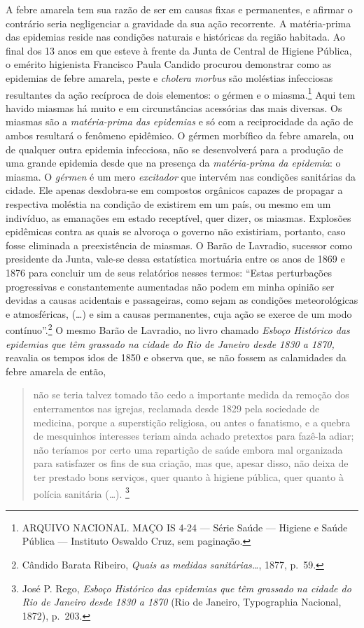 A febre amarela tem sua razão de ser em causas fixas e permanentes, e
afirmar o contrário seria negligenciar a gravidade da sua ação
recorrente. A matéria-prima das epidemias reside nas condições naturais
e históricas da região habitada. Ao final dos 13 anos em que esteve à
frente da Junta de Central de Higiene Pública, o emérito higienista
Francisco Paula Candido procurou demonstrar como as epidemias de febre
amarela, peste e \textit{cholera morbus} são moléstias infecciosas
resultantes da ação recíproca de dois elementos: o gérmen e o
miasma.\footnote{ARQUIVO NACIONAL. MAÇO IS 4-24 --- Série Saúde ---
  Higiene e Saúde Pública --- Instituto Oswaldo Cruz, sem paginação.}
Aqui tem havido miasmas há muito e em circunstâncias acessórias das mais
diversas. Os miasmas são a \textit{matéria-prima das epidemias} e só com a
reciprocidade da ação de ambos resultará o fenômeno epidêmico. O gérmen
morbífico da febre amarela, ou de qualquer outra epidemia infecciosa,
não se desenvolverá para a produção de uma grande epidemia desde que na
presença da \textit{matéria-prima da epidemia}: o miasma. O \textit{gérmen}
é um mero \textit{excitador} que intervém nas condições sanitárias da
cidade. Ele apenas desdobra-se em compostos orgânicos capazes de
propagar a respectiva moléstia na condição de existirem em um país, ou
mesmo em um indivíduo, as emanações em estado receptível, quer dizer, os
miasmas. Explosões epidêmicas contra as quais se alvoroça o governo não
existiriam, portanto, caso fosse eliminada a preexistência de miasmas. O
Barão de Lavradio, sucessor como presidente da Junta, vale-se dessa
estatística mortuária entre os anos de 1869 e 1876 para concluir um de
seus relatórios nesses termos: ``Estas perturbações progressivas e
constantemente aumentadas não podem em minha opinião ser devidas a
causas acidentais e passageiras, como sejam as condições meteorológicas
e atmosféricas, (\ldots{}) e sim a causas permanentes, cuja ação se
exerce de um modo contínuo''.\footnote{Cândido Barata Ribeiro,
  \textit{Quais as medidas sanitárias\ldots{}}, 1877, p.~59.} O mesmo
Barão de Lavradio, no livro chamado \textit{Esboço Histórico das epidemias
que têm grassado na cidade do Rio de Janeiro desde 1830 a 1870,}
reavalia os tempos idos de 1850 e observa que, se não fossem as
calamidades da febre amarela de então,

\begin{quote}
não se teria talvez tomado tão cedo a importante medida da remoção dos
enterramentos nas igrejas, reclamada desde 1829 pela sociedade de
medicina, porque a superstição religiosa, ou antes o fanatismo, e a
quebra de mesquinhos interesses teriam ainda achado pretextos para
fazê-la adiar; não teríamos por certo uma repartição de saúde embora mal
organizada para satisfazer os fins de sua criação, mas que, apesar
disso, não deixa de ter prestado bons serviços, quer quanto à higiene
pública, quer quanto à polícia sanitária (\dots{}). \footnote{José P. Rego,
  \textit{Esboço Histórico das epidemias que têm grassado na cidade do Rio
  de Janeiro desde 1830 a 1870} (Rio de Janeiro, Typographia Nacional,
  1872), p.~203.}
\end{quote}

